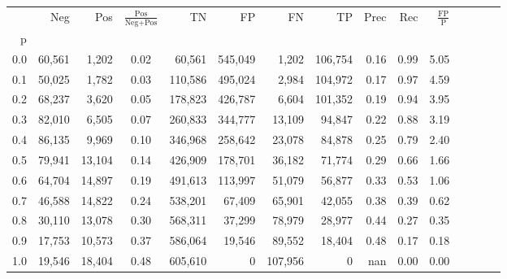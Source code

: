 \begin{tabular}{rrrcrrrrrrrrrrr}
\toprule
{} &     Neg &     Pos & $\frac{\text{Pos}}{\text{Neg}+\text{Pos}}$ &       TN &       FP &       FN &       TP &  Prec &   Rec & $\frac{\text{FP}}{\text{P}}$ \\
p   &         &         &                                            &          &          &          &          &       &       &                              \\
\midrule
0.0 &  60,561 &   1,202 &                                       0.02 &   60,561 &  545,049 &    1,202 &  106,754 &  0.16 &  0.99 &                         5.05 \\
0.1 &  50,025 &   1,782 &                                       0.03 &  110,586 &  495,024 &    2,984 &  104,972 &  0.17 &  0.97 &                         4.59 \\
0.2 &  68,237 &   3,620 &                                       0.05 &  178,823 &  426,787 &    6,604 &  101,352 &  0.19 &  0.94 &                         3.95 \\
0.3 &  82,010 &   6,505 &                                       0.07 &  260,833 &  344,777 &   13,109 &   94,847 &  0.22 &  0.88 &                         3.19 \\
0.4 &  86,135 &   9,969 &                                       0.10 &  346,968 &  258,642 &   23,078 &   84,878 &  0.25 &  0.79 &                         2.40 \\
0.5 &  79,941 &  13,104 &                                       0.14 &  426,909 &  178,701 &   36,182 &   71,774 &  0.29 &  0.66 &                         1.66 \\
0.6 &  64,704 &  14,897 &                                       0.19 &  491,613 &  113,997 &   51,079 &   56,877 &  0.33 &  0.53 &                         1.06 \\
0.7 &  46,588 &  14,822 &                                       0.24 &  538,201 &   67,409 &   65,901 &   42,055 &  0.38 &  0.39 &                         0.62 \\
0.8 &  30,110 &  13,078 &                                       0.30 &  568,311 &   37,299 &   78,979 &   28,977 &  0.44 &  0.27 &                         0.35 \\
0.9 &  17,753 &  10,573 &                                       0.37 &  586,064 &   19,546 &   89,552 &   18,404 &  0.48 &  0.17 &                         0.18 \\
1.0 &  19,546 &  18,404 &                                       0.48 &  605,610 &        0 &  107,956 &        0 &   nan &  0.00 &                         0.00 \\
\bottomrule
\end{tabular}
